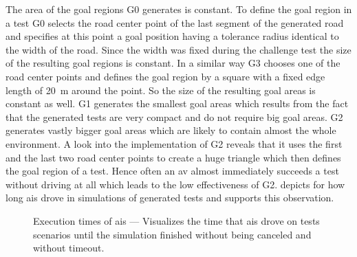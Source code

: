 The area of the goal regions G0 generates is constant.
To define the goal region in a test G0 selects the road center point of the last segment of the generated road and specifies at this point a goal position having a tolerance radius identical to the width of the road.
Since the width was fixed during the challenge test the size of the resulting goal regions is constant.
In a similar way G3 chooses one of the road center points and defines the goal region by a square with a fixed edge length of \SI{20}{\metre} around the point.
So the size of the resulting goal areas is constant as well.
G1 generates the smallest goal areas which results from the fact that the generated tests are very compact and do not require big goal areas.
G2 generates vastly bigger goal areas which are likely to contain almost the whole environment.
A look into the implementation of G2 reveals that it uses the first and the last two road center points to create a huge triangle which then defines the goal region of a test.
Hence often an \gls{av} almost immediately succeeds a test without driving at all which leads to the low effectiveness of G2.
 depicts for how long \glspl{ai} drove in simulations of generated tests and supports this observation.
\begin{figure}
    
    \medskip
    \caption{%
        Execution times of \glspl{ai} --- Visualizes the time that \glspl{ai} drove on tests scenarios until the simulation finished without being canceled and without timeout.
    }\label{fig:executionTimesAIs}
\end{figure}

